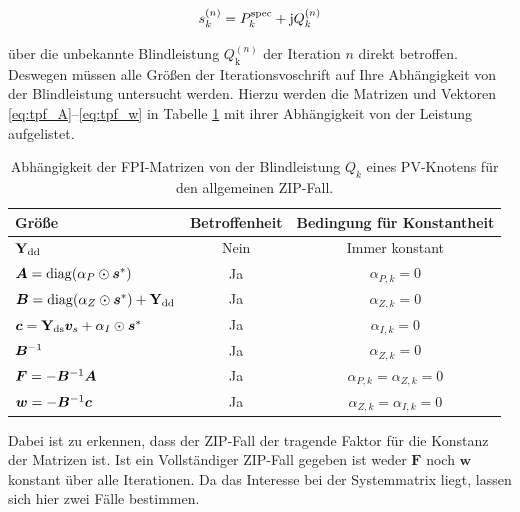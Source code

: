 \begin{equation}
	s_k^{(n)} = P_k^{\mathrm{spec}} + \mathrm{j} Q_k^{(n)}  
	\label{eq:s_pv_change}
\end{equation}

über die unbekannte Blindleistung $Q_\mathrm{k}^{(n)}$ der Iteration $n$ direkt betroffen. 
Deswegen müssen alle Größen der Iterationsvoschrift auf Ihre Abhängigkeit von der Blindleistung untersucht werden. 
Hierzu werden die Matrizen und Vektoren \eqref{eq:tpf_A}--\eqref{eq:tpf_w} in Tabelle \ref{tab:pv_abhaengigkeit_allgemein} mit ihrer Abhängigkeit von der Leistung aufgelistet.\\




%
%

\begin{table}[H]
	\centering
	\caption{Abhängigkeit der FPI-Matrizen von der Blindleistung $Q_k$ eines PV-Knotens für den allgemeinen ZIP-Fall.}
	\label{tab:pv_abhaengigkeit_allgemein}
	\begin{tabular}{@{}lcc@{}}
		\toprule
		\textbf{Größe} & \textbf{Betroffenheit} & \textbf{Bedingung für Konstantheit}\\
		\midrule
		$\mathbf{Y}_{\mathrm{dd}}$ & Nein & Immer konstant  \\
		$\boldsymbol{A} = \operatorname{diag}(\alpha_P \odot \boldsymbol{s}^*)$ & Ja & $\alpha_{P,k} = 0$ \\
		$\boldsymbol{B} = \operatorname{diag}(\alpha_Z \odot \boldsymbol{s}^*) + \mathbf{Y}_{\mathrm{dd}}$ & Ja & $\alpha_{Z,k} = 0$ \\
		$\boldsymbol{c} = \mathbf{Y}_{\mathrm{ds}}\boldsymbol{v}_s + \alpha_I \odot \boldsymbol{s}^*$ & Ja & $\alpha_{I,k} = 0$ \\
		$\boldsymbol{B}^{-1}$ & Ja & $\alpha_{Z,k} = 0$  \\
		$\boldsymbol{F} = -\boldsymbol{B}^{-1}\boldsymbol{A}$ & Ja & $\alpha_{P,k} = \alpha_{Z,k} = 0$ \\
		$\boldsymbol{w} = -\boldsymbol{B}^{-1}\boldsymbol{c}$ & Ja & $\alpha_{Z,k} = \alpha_{I,k} = 0$  \\
		\bottomrule
	\end{tabular}
\end{table}

Dabei ist zu erkennen, dass der ZIP-Fall der tragende Faktor für die Konstanz der Matrizen ist.
Ist ein Vollständiger ZIP-Fall gegeben ist weder $\mathbf{F}$ noch $\mathbf{w}$ konstant über alle Iterationen.
Da das Interesse bei der Systemmatrix liegt, lassen sich hier zwei Fälle bestimmen.\\

